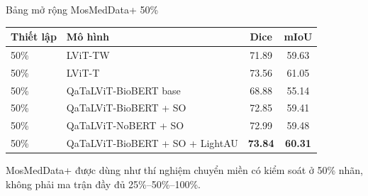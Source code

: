 \documentclass[aspectratio=169,11pt]{beamer}
\newcommand{\smallnote}[1]{%
  \par
  \vspace{0.12cm}
  {\footnotesize\color{ink}#1\par}
}
\begin{document}
\begin{frame}{Bảng mở rộng MosMedData+ 50\%}
  \centering
  \scriptsize
  \renewcommand{\arraystretch}{1.10}
  \begin{tabular}{llcc}
    \toprule
    \textbf{Thiết lập} & \textbf{Mô hình} & \textbf{Dice} & \textbf{mIoU} \\
    \midrule
    50\% & LViT-TW & 71.89 & 59.63 \\
    50\% & LViT-T & 73.56 & 61.05 \\
    50\% & QaTaLViT-BioBERT base & 68.88 & 55.14 \\
    50\% & QaTaLViT-BioBERT + SO & 72.85 & 59.41 \\
    50\% & QaTaLViT-NoBERT + SO & 72.99 & 59.48 \\
    50\% & QaTaLViT-BioBERT + SO + LightAU & \textbf{73.84} & \textbf{60.31} \\
    \bottomrule
  \end{tabular}
  \smallnote{MosMedData+ được dùng như thí nghiệm chuyển miền có kiểm soát ở 50\% nhãn, không phải ma trận đầy đủ 25\%--50\%--100\%.}
\end{frame}
\end{document}
